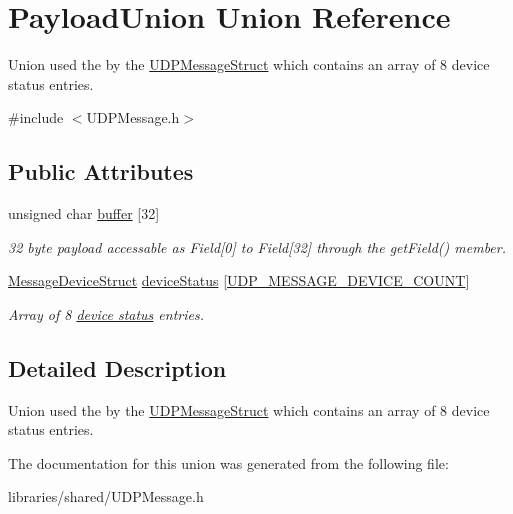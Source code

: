 \hypertarget{union_payload_union}{}\section{Payload\+Union Union Reference}
\label{union_payload_union}


Union used the by the \hyperlink{struct_u_d_p_message_struct}{U\+D\+P\+Message\+Struct} which contains an array of 8 device status entries.  




{\ttfamily \#include $<$U\+D\+P\+Message.\+h$>$}

\subsection*{Public Attributes}
\begin{DoxyCompactItemize}
\item 
\mbox{\label{union_payload_union_a4eaef40c769a6755d280d0dceefb2b28}} 
unsigned char \hyperlink{union_payload_union_a4eaef40c769a6755d280d0dceefb2b28}{buffer} \mbox{[}32\mbox{]}
\begin{DoxyCompactList}\small\item\em 32 byte payload accessable as Field\mbox{[}0\mbox{]} to Field\mbox{[}32\mbox{]} through the get\+Field() member. \end{DoxyCompactList}\item 
\mbox{\label{union_payload_union_a3c4c34d10b91dfcadd961e3a496e48d1}} 
\hyperlink{struct_message_device_struct}{Message\+Device\+Struct} \hyperlink{union_payload_union_a3c4c34d10b91dfcadd961e3a496e48d1}{device\+Status} \mbox{[}\hyperlink{_global_defs_8h_a6c62e16c6f0248dbc337e8bc8df5bbc8}{U\+D\+P\+\_\+\+M\+E\+S\+S\+A\+G\+E\+\_\+\+D\+E\+V\+I\+C\+E\+\_\+\+C\+O\+U\+NT}\mbox{]}
\begin{DoxyCompactList}\small\item\em Array of 8 \hyperlink{struct_message_device_struct}{device status} entries. \end{DoxyCompactList}\end{DoxyCompactItemize}


\subsection{Detailed Description}
Union used the by the \hyperlink{struct_u_d_p_message_struct}{U\+D\+P\+Message\+Struct} which contains an array of 8 device status entries. 

The documentation for this union was generated from the following file\+:\begin{DoxyCompactItemize}
\item 
libraries/shared/U\+D\+P\+Message.\+h\end{DoxyCompactItemize}

